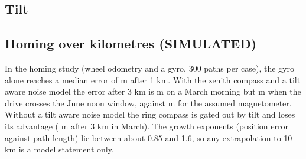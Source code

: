 \subsection{Tilt}
\label{sec:tilt}


\subsection{Homing over kilometres (SIMULATED)}
In the homing study (wheel odometry and a gyro, 300 paths per case), the gyro alone reaches a median error of \shomMGyroonek{} m after 1 km. With the zenith compass and a tilt aware noise model the error after 3 km is \shomMZenTAthreek{} m on a March morning but \shomJZenTAthreek{} m when the drive crosses the June noon window, against \shomMMagthreek{} m for the assumed magnetometer. Without a tilt aware noise model the ring compass is gated out by tilt and loses its advantage (\shomMRingthreek{} m after 3 km in March). The growth exponents (position error against path length) lie between about 0.85 and 1.6, so any extrapolation to 10 km is a model statement only.
